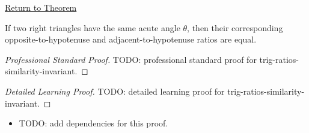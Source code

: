 \newpage
{}
\label{prf:trig-ratios-similarity-invariant}

\begin{remark*}[Return]
\hyperref[thm:trig-ratios-similarity-invariant]{Return to Theorem}
\end{remark*}

\begin{theorem*}
If two right triangles have the same acute angle $\theta$, then their
corresponding opposite-to-hypotenuse and adjacent-to-hypotenuse ratios are
equal.
\end{theorem*}

\begin{proof}[Professional Standard Proof]
\LRAProofBodyStart
TODO: professional standard proof for trig-ratios-similarity-invariant.
\end{proof}

\begin{proof}[Detailed Learning Proof]
\LRAProofBodyStart
TODO: detailed learning proof for trig-ratios-similarity-invariant.
\end{proof}

\begin{remark*}
\end{remark*}

\begin{dependencies}
\begin{itemize}
  \item TODO: add dependencies for this proof.
\end{itemize}
\end{dependencies}

\clearpage
